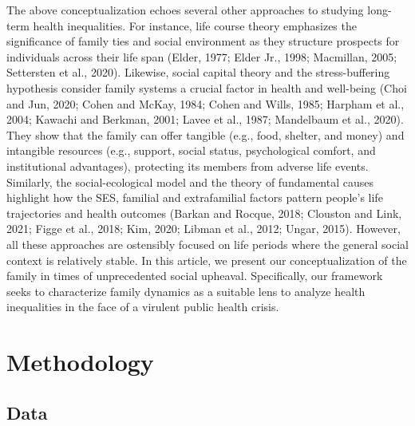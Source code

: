 \documentclass[
]{article}
\begin{document}
The above conceptualization echoes several other approaches to studying
long-term health inequalities. For instance, life course theory emphasizes the
significance of family ties and social environment as they structure prospects
for individuals across their life span (Elder, 1977; Elder Jr., 1998; Macmillan,
2005; Settersten et al., 2020). Likewise, social capital theory and the
stress-buffering hypothesis consider family systems a crucial factor in health
and well-being (Choi and Jun, 2020; Cohen and McKay, 1984; Cohen and Wills,
1985; Harpham et al., 2004; Kawachi and Berkman, 2001; Lavee et al., 1987;
Mandelbaum et al., 2020). They show that the family can offer tangible (e.g.,
food, shelter, and money) and intangible resources (e.g., support, social
status, psychological comfort, and institutional advantages), protecting its
members from adverse life events. Similarly, the social-ecological model and the
theory of fundamental causes highlight how the SES, familial and extrafamilial
factors pattern people's life trajectories and health outcomes (Barkan and
Rocque, 2018; Clouston and Link, 2021; Figge et al., 2018; Kim, 2020; Libman et
al., 2012; Ungar, 2015). However, all these approaches are ostensibly focused on
life periods where the general social context is relatively stable. In this
article, we present our conceptualization of the family in times of
unprecedented social upheaval. Specifically, our framework seeks to characterize
family dynamics as a suitable lens to analyze health inequalities in the face of
a virulent public health crisis.

\newpage

\hypertarget{methodology-1}{%
\section{Methodology}\label{methodology-1}}

\hypertarget{data-1}{%
\subsection{Data}\label{data-1}}
\end{document}

